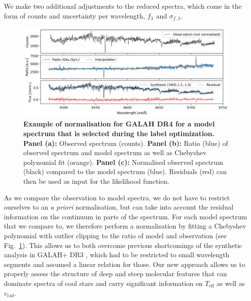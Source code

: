 \documentclass[
  journal=pasa,
  manuscript=research-paper, %
  year=2024,
  volume=37
]{cup-journal}
\newcommand{\SB}[1]{{\textcolor{purple}{#1}}}
\newcommand{\Teff}{$T_\mathrm{eff}$\xspace}
\newcommand{\logg}{$\log g$\xspace}
\newcommand{\feh}{$\mathrm{[Fe/H]}$\xspace}
\newcommand{\vrad}{$v_\mathrm{rad}$\xspace}
\newcommand{\TheCannon}{\textit{The Cannon}\xspace}
\newcommand{\dex}{\,\mathrm{dex}}	%
\newcommand{\K}{\,\mathrm{K}}	%
\begin{document}
We make two additional adjustments to the reduced spectra, which come in the form of counts and uncertainty per wavelength, $f_\lambda$ and $\sigma_{f,\lambda}$.

\begin{figure}[ht]
\centering
\includegraphics[width=\textwidth]{figures/Nuisance_example.png}
\caption{
\textbf{Example of normalisation for GALAH DR4 for a model spectrum that is selected during the label optimization.}
\textbf{Panel (a):} Observed spectrum (counts).
\textbf{Panel (b):} Ratio (blue) of observed spectrum and model spectrum as well as Chebyshev polynomial fit (orange).
\textbf{Panel (c):} Normalised observed spectrum (black) compared to the model spectrum (blue). Residuals (red) can then be used as input for the likelihood function.
}
\label{fig:ratio_normalisation}
\end{figure}

As we compare the observation to model spectra, we do not have to restrict ourselves to an \textit{a priori} normalisation, but can take into account the residual information on the continuum in parts of the spectrum. For each model spectrum that we compare to, we therefore perform a normalisation by fitting a Chebyshev polynomial with outlier clipping to the ratio of model and observation (see Fig.~\ref{fig:ratio_normalisation}). This allows us to both overcome previous shortcomings of the synthetic analysis in GALAH+ DR3 \citep{Buder2021}, which had to be restricted to small wavelength segments and assumed a linear relation for those. Our new approach allows us to properly assess the structure of deep and steep molecular features that can dominate spectra of cool stars and carry significant information on \Teff as well as \vrad.

\end{document}
